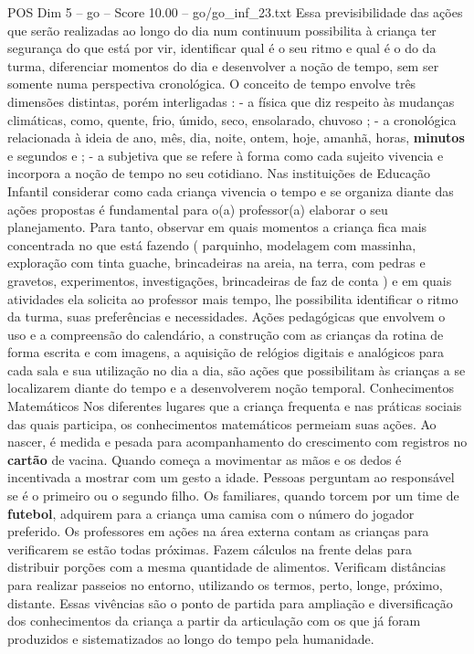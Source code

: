 \begin{textsample}{POS Dim 5 – go – Score 10.00 – go/go\_inf\_23.txt}
Essa previsibilidade das ações que serão realizadas ao longo do dia num continuum possibilita à criança ter segurança do que está por vir, identificar qual é o seu ritmo e qual é o do da turma, diferenciar momentos do dia e desenvolver a noção de tempo, sem ser somente numa perspectiva cronológica.
O conceito de tempo envolve três dimensões distintas, porém interligadas : - a física que diz respeito às mudanças climáticas, como, quente, frio, úmido, seco, ensolarado, chuvoso ; - a cronológica relacionada à ideia de ano, mês, dia, noite, ontem, hoje, amanhã, horas, \textbf{minutos} e segundos e ; - a subjetiva que se refere à forma como cada sujeito vivencia e incorpora a noção de tempo no seu cotidiano.
Nas instituições de Educação Infantil considerar como cada criança vivencia o tempo e se organiza diante das ações propostas é fundamental para o(a) professor(a) elaborar o seu planejamento.
Para tanto, observar em quais momentos a criança fica mais concentrada no que está fazendo ( parquinho, modelagem com massinha, exploração com tinta guache, brincadeiras na areia, na terra, com pedras e gravetos, experimentos, investigações, brincadeiras de faz de conta ) e em quais atividades ela solicita ao professor mais tempo, lhe possibilita identificar o ritmo da turma, suas preferências e necessidades.
Ações pedagógicas que envolvem o uso e a compreensão do calendário, a construção com as crianças da rotina de forma escrita e com imagens, a aquisição de relógios digitais e analógicos para cada sala e sua utilização no dia a dia, são ações que possibilitam às crianças a se localizarem diante do tempo e a desenvolverem noção temporal.
Conhecimentos Matemáticos Nos diferentes lugares que a criança frequenta e nas práticas sociais das quais participa, os conhecimentos matemáticos permeiam suas ações.
Ao nascer, é medida e pesada para acompanhamento do crescimento com registros no \textbf{cartão} de vacina.
Quando começa a movimentar as mãos e os dedos é incentivada a mostrar com um gesto a idade.
Pessoas perguntam ao responsável se é o primeiro ou o segundo filho.
Os familiares, quando torcem por um time de \textbf{futebol}, adquirem para a criança uma camisa com o número do jogador preferido.
Os professores em ações na área externa contam as crianças para verificarem se estão todas próximas.
Fazem cálculos na frente delas para distribuir porções com a mesma quantidade de alimentos.
Verificam distâncias para realizar passeios no entorno, utilizando os termos, perto, longe, próximo, distante.
Essas vivências são o ponto de partida para ampliação e diversificação dos conhecimentos da criança a partir da articulação com os que já foram produzidos e sistematizados ao longo do tempo pela humanidade.

\end{textsample}
